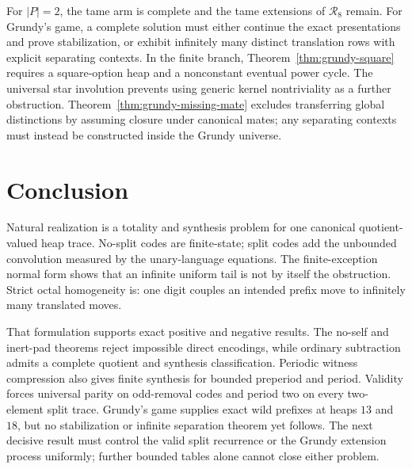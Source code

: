 \documentclass[11pt]{article}
\theoremstyle{definition}
\theoremstyle{remark}
\begin{document}
For $|P|=2$, the tame arm is complete and the tame extensions of
$\mathcal R_8$ remain.  For Grundy's game, a complete solution must either
continue the exact presentations and prove stabilization, or exhibit
infinitely many distinct translation rows with explicit separating contexts.
In the finite branch, Theorem~\ref{thm:grundy-square} requires a
square-option heap and a nonconstant eventual power cycle.  The universal
star involution prevents using generic kernel nontriviality as a further
obstruction.  Theorem~\ref{thm:grundy-missing-mate} excludes transferring
global distinctions by assuming closure under canonical mates; any separating
contexts must instead be constructed inside the Grundy universe.

\section{Conclusion}

Natural realization is a totality and synthesis problem for one canonical
quotient-valued heap trace.  No-split codes are finite-state; split codes add
the unbounded convolution measured by the unary-language equations.  The
finite-exception normal form shows that an infinite uniform tail is not by
itself the obstruction.  Strict octal homogeneity is: one digit couples an
intended prefix move to infinitely many translated moves.

That formulation supports exact positive and negative results.  The no-self
and inert-pad theorems reject impossible direct encodings, while ordinary
subtraction admits a complete quotient and synthesis
classification.  Periodic witness compression also gives finite synthesis
for bounded preperiod and period.  Validity forces universal parity on odd-removal codes and
period two on every two-element split trace.  Grundy's game supplies exact wild
prefixes at heaps $13$ and $18$, but no stabilization or infinite separation
theorem yet follows.  The next decisive result must control the valid split
recurrence or the Grundy extension process uniformly; further bounded tables
alone cannot close either problem.



\end{document}
